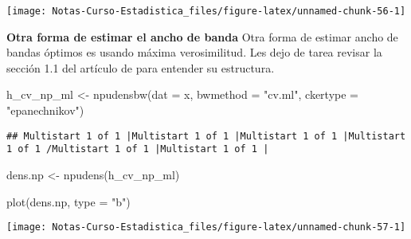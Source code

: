 \documentclass[
  12pt,
]{book}
\newenvironment{Shaded}{\begin{snugshade}}{\end{snugshade}}
\newcommand{\AttributeTok}[1]{\textcolor[rgb]{0.77,0.63,0.00}{#1}}
\newcommand{\FunctionTok}[1]{\textcolor[rgb]{0.00,0.00,0.00}{#1}}
\newcommand{\NormalTok}[1]{#1}
\newcommand{\OtherTok}[1]{\textcolor[rgb]{0.56,0.35,0.01}{#1}}
\newcommand{\StringTok}[1]{\textcolor[rgb]{0.31,0.60,0.02}{#1}}
\theoremstyle{definition}
\theoremstyle{definition}
\theoremstyle{definition}
\theoremstyle{definition}
\theoremstyle{remark}
\begin{document}
\begin{center}\texttt{[image: Notas-Curso-Estadistica\_files/figure-latex/unnamed-chunk-56-1]} \end{center}

\textbf{Otra forma de estimar el ancho de banda} Otra forma de estimar ancho
de bandas óptimos es usando máxima verosimilitud. Les dejo de tarea
revisar la sección 1.1 del artículo de \autocite{Hall1987} para entender su
estructura.

\begin{Shaded}
\begin{Highlighting}[]
\NormalTok{h\_cv\_np\_ml }\OtherTok{\textless{}{-}} \FunctionTok{npudensbw}\NormalTok{(}\AttributeTok{dat =}\NormalTok{ x, }\AttributeTok{bwmethod =} \StringTok{"cv.ml"}\NormalTok{,}
    \AttributeTok{ckertype =} \StringTok{"epanechnikov"}\NormalTok{)}
\end{Highlighting}
\end{Shaded}

\begin{verbatim}
## Multistart 1 of 1 |Multistart 1 of 1 |Multistart 1 of 1 |Multistart 1 of 1 /Multistart 1 of 1 |Multistart 1 of 1 |                   
\end{verbatim}

\begin{Shaded}
\begin{Highlighting}[]
\NormalTok{dens.np }\OtherTok{\textless{}{-}} \FunctionTok{npudens}\NormalTok{(h\_cv\_np\_ml)}

\FunctionTok{plot}\NormalTok{(dens.np, }\AttributeTok{type =} \StringTok{"b"}\NormalTok{)}
\end{Highlighting}
\end{Shaded}

\begin{center}\texttt{[image: Notas-Curso-Estadistica\_files/figure-latex/unnamed-chunk-57-1]} \end{center}
\end{document}

